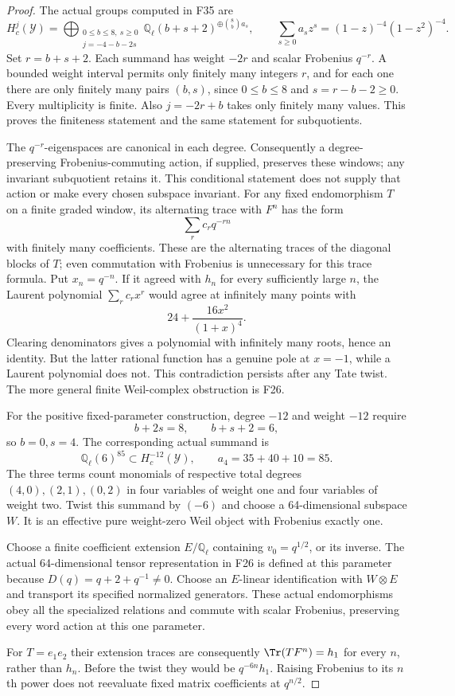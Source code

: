 \documentclass[11pt,a4paper]{article}
\newcommand{\Q}{\mathbb Q}\newcommand{\Z}{\mathbb Z}\newcommand{\C}{\mathbb C}\newcommand{\N}{\mathbb N}\newcommand{\F}{\mathbb F}
\newcommand{\fid}[1]{\textsf{#1}}\newcommand{\gate}[1]{\textsf{#1}}
\theoremstyle{named}\newtheorem{finding}{Finding}[section]
\theoremstyle{definition}\newtheorem{definition}[finding]{Definition}
\theoremstyle{remark}\newtheorem{remark}[finding]{Remark}
\begin{document}
\begin{proof}
The actual groups computed in \fid{F35} are
\[
 H_c^j(\mathcal Y)=
 \bigoplus_{\substack{0\le b\le8,\ s\ge0\\j=-4-b-2s}}
     \Q_\ell(b+s+2)^{\oplus\binom8b a_s},
 \qquad
 \sum_{s\ge0}a_s z^s=(1-z)^{-4}(1-z^2)^{-4}.
\]
Set $r=b+s+2$. Each summand has weight $-2r$ and scalar
Frobenius $q^{-r}$. A bounded weight interval permits only
finitely many integers $r$, and for each one there are only
finitely many pairs $(b,s)$, since $0\le b\le8$ and
$s=r-b-2\ge0$. Every multiplicity is finite. Also
$j=-2r+b$ takes only finitely many values. This proves the
finiteness statement and the same statement for subquotients.

The $q^{-r}$-eigenspaces are canonical in each degree.
Consequently a degree-preserving Frobenius-commuting action,
if supplied, preserves these windows; any invariant
subquotient retains it. This conditional statement does not
supply that action or make every chosen subspace invariant.
For any fixed endomorphism $T$ on a finite graded window,
its alternating trace with $F^n$ has the form
\[
 \sum_r c_r q^{-rn}
\]
with finitely many coefficients. These are the alternating
traces of the diagonal blocks of $T$; even commutation with
Frobenius is unnecessary for this trace formula.
Put $x_n=q^{-n}$. If it agreed with $h_n$ for every
sufficiently large $n$, the Laurent polynomial $\sum_r c_rx^r$
would agree at infinitely many points with
\[
 24+\frac{16x^2}{(1+x)^4}.
\]
Clearing denominators gives a polynomial with infinitely many
roots, hence an identity. But the latter rational function has
a genuine pole at $x=-1$, while a Laurent polynomial does not.
This contradiction persists after any Tate twist. The more
general finite Weil-complex obstruction is \fid{F26}.

For the positive fixed-parameter construction, degree $-12$
and weight $-12$ require
\[
 b+2s=8,\qquad b+s+2=6,
\]
so $b=0,s=4$. The corresponding actual summand is
\[
 \Q_\ell(6)^{85}\subset H_c^{-12}(\mathcal Y),
 \qquad a_4=35+40+10=85.
\]
The three terms count monomials of respective total degrees
$(4,0),(2,1),(0,2)$ in four variables of weight one and four
variables of weight two. Twist this summand by $(-6)$ and
choose a 64-dimensional subspace $W$. It is an effective
pure weight-zero Weil object with Frobenius exactly one.

Choose a finite coefficient extension $E/\Q_\ell$ containing
$v_0=q^{1/2}$, or its inverse. The actual 64-dimensional tensor
representation in \fid{F26} is defined at this parameter because
$D(q)=q+2+q^{-1}\ne0$. Choose an $E$-linear identification
with $W\otimes E$ and transport its specified normalized
generators. These actual endomorphisms obey all the specialized
relations and commute with scalar Frobenius, preserving every
word action at this one parameter.

For $T=e_1e_2$ their extension traces are consequently
$\Tr(TF^n)=h_1$ for every $n$, rather than $h_n$.
Before the twist they would be $q^{-6n}h_1$.
Raising Frobenius to its $n$th power does not reevaluate fixed
matrix coefficients at $q^{n/2}$.
\end{proof}
\end{document}
